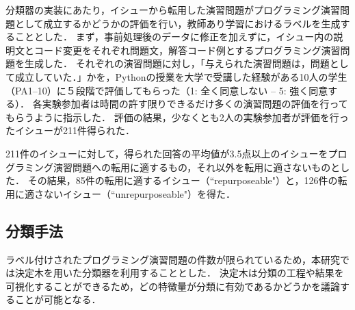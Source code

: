 分類器の実装にあたり，イシューから転用した演習問題がプログラミング演習問題として成立するかどうかの評価を行い，教師あり学習におけるラベルを生成することとした．
まず，事前処理後のデータに修正を加えずに，イシュー内の説明文とコード変更をそれぞれ問題文，解答コード例とするプログラミング演習問題を生成した．
それぞれの演習問題に対し，「与えられた演習問題は，問題として成立していた．」かを，Pythonの授業を大学で受講した経験がある10人の学生（PA1--10）に５段階で評価してもらった（1: 全く同意しない -- 5: 強く同意する）．
各実験参加者は時間の許す限りできるだけ多くの演習問題の評価を行ってもらうように指示した．
評価の結果，少なくとも2人の実験参加者が評価を行ったイシューが211件得られた．


211件のイシューに対して，得られた回答の平均値が3.5点以上のイシューをプログラミング演習問題への転用に適するもの，それ以外を転用に適さないものとした．
その結果，85件の転用に適するイシュー（``repurposeable"）と，126件の転用に適さないイシュー（``unrepurposeable"）を得た．


\subsection{分類手法}
% 
ラベル付けされたプログラミング演習問題の件数が限られているため，本研究では決定木を用いた分類器を利用することとした．
決定木は分類の工程や結果を可視化することができるため，どの特徴量が分類に有効であるかどうかを議論することが可能となる．

